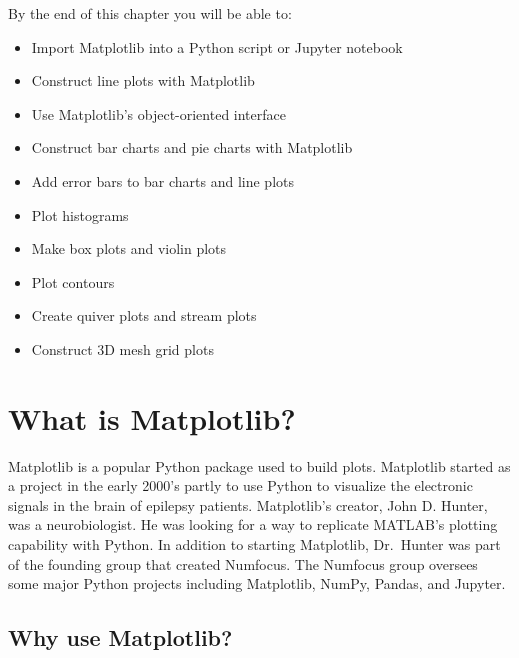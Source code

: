 \documentclass{book}
\begin{document}
    
        By the end of this chapter you will be able to:

\begin{itemize}
\item
  Import Matplotlib into a Python script or Jupyter notebook
\item
  Construct line plots with Matplotlib
\item
  Use Matplotlib's object-oriented interface
\item
  Construct bar charts and pie charts with Matplotlib
\item
  Add error bars to bar charts and line plots
\item
  Plot histograms
\item
  Make box plots and violin plots
\item
  Plot contours
\item
  Create quiver plots and stream plots
\item
  Construct 3D mesh grid plots
\end{itemize}
        \newpage

    




    
        \hypertarget{what-is-matplotlib}{%
\section{What is Matplotlib?}\label{what-is-matplotlib}}
    




    
        Matplotlib is a popular Python package used to build plots. Matplotlib
started as a project in the early 2000's partly to use Python to
visualize the electronic signals in the brain of epilepsy patients.
Matplotlib's creator, John D. Hunter, was a neurobiologist. He was
looking for a way to replicate MATLAB's plotting capability with Python.
In addition to starting Matplotlib, Dr.~Hunter was part of the founding
group that created Numfocus. The Numfocus group oversees some major
Python projects including Matplotlib, NumPy, Pandas, and Jupyter.
    




    
        \hypertarget{why-use-matplotlib}{%
\subsection{Why use Matplotlib?}\label{why-use-matplotlib}}
    
\end{document}
